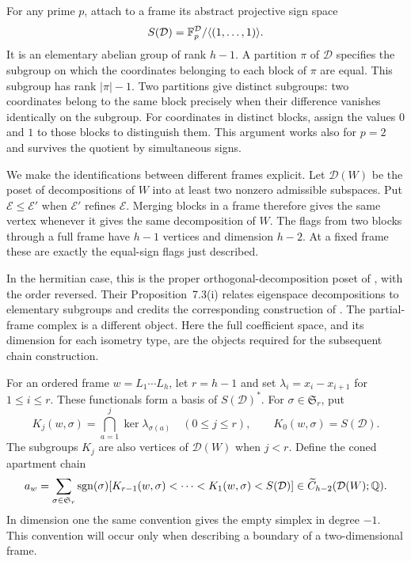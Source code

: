 For any prime $p$, attach to a frame its abstract projective sign space
\[
 S(\mathcal D)=\mathbb F_p^{\mathcal D}/\langle(1,\ldots,1)\rangle.
\]
It is an elementary abelian group of rank $h-1$.  A partition $\pi$ of
$\mathcal D$ specifies the subgroup on which the coordinates belonging to
each block of $\pi$ are equal.  This subgroup has rank $|\pi|-1$.
Two partitions give distinct subgroups: two coordinates belong to the
same block precisely when their difference vanishes identically on the
subgroup.  For coordinates in distinct blocks, assign the values $0$ and
$1$ to those blocks to distinguish them.  This argument works also for
$p=2$ and survives the quotient by simultaneous signs.

We make the identifications between different frames explicit.  Let
$\mathcal D(W)$ be the poset of decompositions of $W$ into at least two
nonzero admissible subspaces.  Put $\mathcal E\leq\mathcal E'$ when
$\mathcal E'$ refines $\mathcal E$.  Merging blocks in a frame therefore
gives the same vertex whenever it gives the same decomposition of $W$.
The flags from two blocks through a full frame have $h-1$ vertices and
dimension $h-2$.  At a fixed frame these are exactly the equal-sign flags
just described.

In the hermitian case, this is the proper orthogonal-decomposition
poset of \citet[Sections~2.1 and~7.2, arXiv version~2]{PitermanWelker2024},
with the order reversed. Their Proposition~7.3(i) relates eigenspace
decompositions to elementary subgroups and credits the corresponding
construction of \citet[pp.~514--515]{AschbacherSmith1993}.
The partial-frame complex is a different object. Here the full
coefficient space, and its dimension for each isometry type, are the
objects required for the subsequent chain construction.

For an ordered frame $w=L_1\cdots L_h$, let $r=h-1$ and set
$\lambda_i=x_i-x_{i+1}$ for $1\leq i\leq r$.  These functionals form a
basis of $S(\mathcal D)^*$.  For $\sigma\in\mathfrak S_r$, put
\[
 K_j(w,\sigma)=\bigcap_{a=1}^j\ker\lambda_{\sigma(a)}
 \quad(0\leq j\leq r),\qquad K_0(w,\sigma)=S(\mathcal D).
\]
The subgroups $K_j$ are also vertices of $\mathcal D(W)$ when $j<r$.
Define the coned apartment chain
\begin{equation}\label{eq:frame-apartment}
 a_w=\sum_{\sigma\in\mathfrak S_r}\operatorname{sgn}(\sigma)
 [K_{r-1}(w,\sigma)<\cdots<K_1(w,\sigma)<S(\mathcal D)]
 \in\widetilde C_{h-2}(\mathcal D(W);\mathbb Q).
\end{equation}
In dimension one the same convention gives the empty simplex in degree
$-1$.  This convention will occur only when describing a boundary of a
two-dimensional frame.

